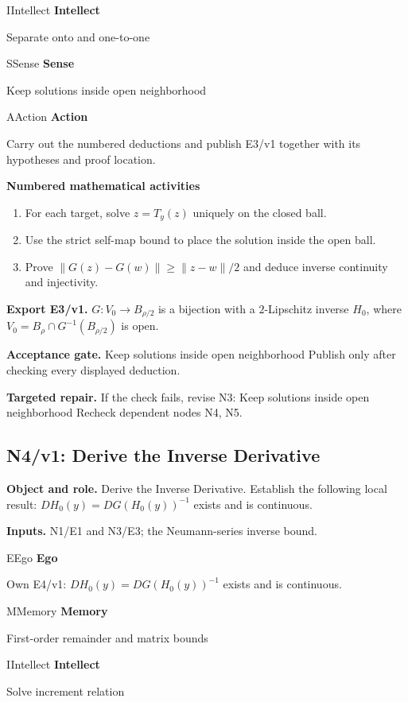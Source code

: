 \documentclass[preprint,12pt,aps,pra,showkeys,amsmath,amssymb,superscriptaddress,floatfix]{revtex4-2}
\theoremstyle{definition}
\theoremstyle{remark}
\newcommand{\mmfaculty}[3]{%
 \begin{mmfacultybox}{#1}{#2}
 {\sffamily\bfseries\color{MMBlue}#2}\par\smallskip #3
 \end{mmfacultybox}}
\newcommand{\field}[2]{\par\smallskip\noindent\textbf{#1.} #2\par}
\begin{document}
\mmfaculty{I}{Intellect}{Separate onto and one-to-one}

\mmfaculty{S}{Sense}{Keep solutions inside open neighborhood}

\mmfaculty{A}{Action}{Carry out the numbered deductions and publish E3/v1 together with its
hypotheses and proof location.}

\smallskip\noindent\textbf{Numbered mathematical activities}

\begin{enumerate}[label=N3.\arabic*,leftmargin=3.4em]

\item For each target, solve \(z=T_y(z)\) uniquely on the closed ball.

\item Use the strict self-map bound to place the solution inside the open
ball.

\item Prove \(\|G(z)-G(w)\|\ge\|z-w\|/2\) and deduce inverse continuity and
injectivity.

\end{enumerate}

\field{Export E3/v1}{\(G:V_0\to B_{\rho/2}\) is a bijection with a \(2\)-Lipschitz inverse
\(H_0\), where \(V_0=B_\rho\cap G^{-1}(B_{\rho/2})\) is open.}

\field{Acceptance gate}{Keep solutions inside open neighborhood Publish only after checking
every displayed deduction.}

\field{Targeted repair}{If the check fails, revise N3: Keep solutions inside open neighborhood
Recheck dependent nodes N4, N5.}

\clearpage

\subsection{N4/v1: Derive the Inverse Derivative}

\field{Object and role}{Derive the Inverse Derivative. Establish the following local result:
\(DH_0(y)=DG(H_0(y))^{-1}\) exists and is continuous.}

\field{Inputs}{N1/E1 and N3/E3; the Neumann-series inverse bound.}

\mmfaculty{E}{Ego}{Own E4/v1: \(DH_0(y)=DG(H_0(y))^{-1}\) exists and is continuous.}

\mmfaculty{M}{Memory}{First-order remainder and matrix bounds}

\mmfaculty{I}{Intellect}{Solve increment relation}
\end{document}
